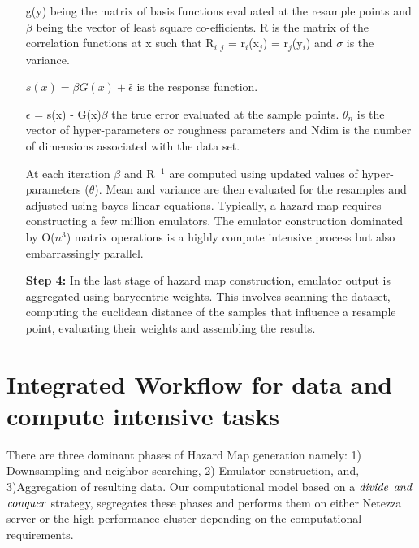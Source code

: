 \documentclass{acm_proc_article-sp}
\begin{document}
\begin{enumerate}
g(y) being  the matrix of basis functions evaluated at the resample points and $\beta$ being the vector of least square co-efficients.
R is the matrix of the correlation functions at x such that R$_{i,j}$ = r$_{i}$(x$_{j}$) = r$_{j}$(y$_{i}$) and $\sigma$ is the variance.


$s(x) = {\beta}G(x) + \hat{\epsilon}$ is the response function.

$\epsilon$ = s(x) - G(x)$\beta$ the true error evaluated at the sample points. 
$\theta$$_{n}$ is the
vector of hyper-parameters or roughness parameters and Ndim is the number of dimensions associated with the data set.


At each iteration 
$\beta$ and R$^{-1}$ are computed using updated values of hyper-parameters ($\theta$).
Mean and variance are then evaluated for the resamples and adjusted using bayes
linear equations. Typically, a hazard map requires constructing a few million emulators.
The emulator construction dominated by O($n^{3}$) matrix operations is a highly compute intensive process but also embarrassingly
parallel.

\item [ {\bf Step 4:}] In the last stage of hazard map construction, emulator output is aggregated using barycentric weights.
This involves scanning the dataset, computing the euclidean distance of the samples that influence a resample point, evaluating their weights
 and assembling the results.

\end{enumerate}



\section{Integrated Workflow for data and compute intensive tasks}
There are three dominant phases of Hazard Map generation namely:
1) Downsampling and neighbor searching,
2) Emulator construction, and, 3)Aggregation of resulting data.
Our computational model based on a $\it{divide}$ $\it{and}$ $\it{conquer}$ strategy, segregates these phases and performs them on either Netezza
server or the high performance cluster depending on the computational requirements.
\end{document}
